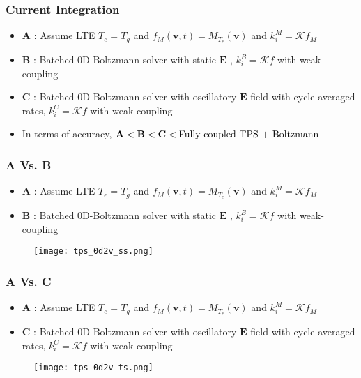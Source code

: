 \documentclass[mathserif, aspectratio=169]{beamer}
\newcommand{\vect}[1]{\boldsymbol{#1}}
\begin{document}
\begin{frame}
	\frametitle{Current Integration}
	\begin{itemize}
		\item \textbf{A} : Assume LTE $T_e=T_g$ and $f_M(\vect{v}, t)=M_{T_e}(\vect{v})$ and $k_i^{M} = \mathcal{K}f_M$
		\item \textbf{B} : Batched 0D-Boltzmann solver with static $\vect{E}$ , $k_i^{B} = \mathcal{K}f$ with weak-coupling
		\item \textbf{C} : Batched 0D-Boltzmann solver with oscillatory $\vect{E}$ field with cycle averaged rates, $k_i^{C} = \mathcal{K}f$ with weak-coupling
		\item In-terms of accuracy, $\text{\textbf{A}} < \text{\textbf{B}} < \text{\textbf{C}} < \text{Fully coupled TPS + Boltzmann}$
	\end{itemize}
\end{frame}

\begin{frame}
	\frametitle{A Vs. B}
	\begin{itemize}
		\item \textbf{A} : Assume LTE $T_e=T_g$ and $f_M(\vect{v}, t)=M_{T_e}(\vect{v})$ and $k_i^{M} = \mathcal{K}f_M$
		\item \textbf{B} : Batched 0D-Boltzmann solver with static $\vect{E}$ , $k_i^{B} = \mathcal{K}f$ with weak-coupling
	\end{itemize}

	\begin{figure}
		\begin{center}
			\hspace{-2.25in}
			\texttt{[image: tps\_0d2v\_ss.png]}
		\end{center}
	\end{figure}
\end{frame}

\begin{frame}
	\frametitle{A Vs. C}
	\begin{itemize}
		\item \textbf{A} : Assume LTE $T_e=T_g$ and $f_M(\vect{v}, t)=M_{T_e}(\vect{v})$ and $k_i^{M} = \mathcal{K}f_M$
		\item \textbf{C} : Batched 0D-Boltzmann solver with oscillatory $\vect{E}$ field with cycle averaged rates, $k_i^{C} = \mathcal{K}f$ with weak-coupling
	\end{itemize}
	\begin{figure}
		\begin{center}
			\hspace{-2.25in}
			\texttt{[image: tps\_0d2v\_ts.png]}
		\end{center}
	\end{figure}
\end{frame}
\end{document}
